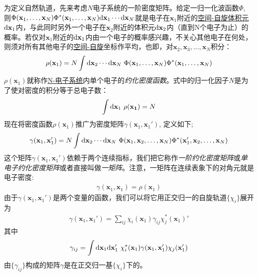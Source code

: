 为定义自然轨道，先来考虑$N$电子系统的一阶密度矩阵。给定一归一化波函数$\Phi$, 则$\Phi(\mathbf{x}_1,\ldots,\mathbf{x}_N)\Phi^*(\mathbf{x}_1,\ldots,\mathbf{x}_N)\ddx_1\cdots\ddx_N$就是电子在$\mathbf{x}_1$附近的\underline{\underline{空间-自旋}体积元}$\ddx_1$内，与此同时另外一个电子在$\mathbf{x}_2$附近的体积元$\ddx_2$内（直到N个电子为止）的概率。若仅对$\mathbf{x}_1$附近的$\ddx_1$内由一个电子的概率感兴趣，不关心其他电子在何处，则须对所有其他电子的\underline{空间-自旋}坐标作平均，也即，对$\mathbf{x}_2,\mathbf{x}_3,\ldots,\mathbf{x}_N$积分：
\begin{align}
\rho(\mathbf{x}_1) = N \int\ddx_2\cdots\ddx_N \,\, \Phi(\mathbf{x}_1,\ldots,\mathbf{x}_N)\Phi^*(\mathbf{x}_1,\ldots,\mathbf{x}_N)
\end{align}
$\rho(\mathbf{x}_1)$就称作\underline{N-电子系统}内单个电子的\emph{约化密度函数}。式中的归一化因子$N$是为了使对密度的积分等于总电子数：
\begin{align}
\int\ddx_1\,\,\rho(\mathbf{x_1}) = N
\end{align}
现在将密度函数$\rho(\mathbf{x}_1)$推广为密度矩阵$\gamma(\mathbf{x}_1,\mathbf{x}_1')$, 定义如下;
\begin{align}
\label{4.35}
\gamma(\mathbf{x}_1,\mathbf{x}_1') = N \int\ddx_2\cdots\ddx_N \,\, \Phi(\mathbf{x}_1,\mathbf{x}_2,\ldots,\mathbf{x}_N)\Phi^*(\mathbf{x}_1',\mathbf{x}_2,\ldots,\mathbf{x}_N)
\end{align}
这个矩阵$\gamma(\mathbf{x}_1,\mathbf{x}_1')$依赖于两个连续指标，我们把它称作\emph{一阶约化密度矩阵}或\emph{单电子约化密度矩阵}或者直接叫做\emph{一矩阵}。注意，一矩阵在连续表象下的对角元就是电子密度:
\begin{align}
\gamma(\mathbf{x}_1,\mathbf{x}_1) = \rho(\mathbf{x}_1)
\end{align}
由于$\gamma(\mathbf{x}_1,\mathbf{x}_1')$是两个变量的函数，我们可以将它用正交归一的\hft 自旋轨道$\{\chi_i\}$展开为
\begin{align}
\gamma(\mathbf{x}_1,\mathbf{x}_1') = \sum_{ij} \chi_i(\mathbf{x}_1) \gamma_{ij} \chi_j^*(\mathbf{x}_1)'
\label{4.37}
\end{align}
其中
\begin{align}
\gamma_{ij} = \int\ddx_1\ddx_1'\,\,\chi_i^*(\mathbf{x}_1)\gamma(\mathbf{x}_1,\mathbf{x}_1')\chi_j(\mathbf{x}_1')
\end{align}
由$\{\gamma_{ij}\}$构成的矩阵$\gamma$是在正交归一基$\{\chi_i\}$下的。

